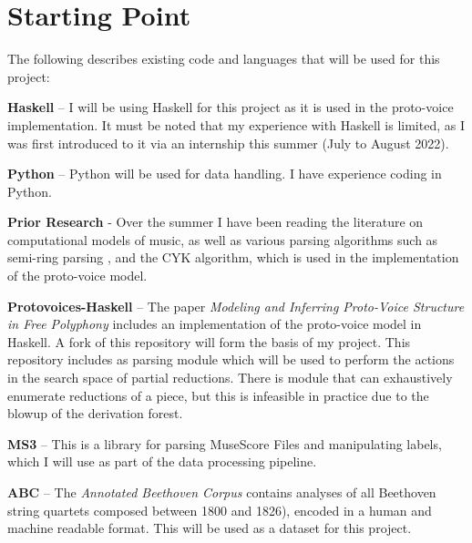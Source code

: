 \documentclass{article}
\newcommand{\keyword}[1]{\textbf{#1}}
\begin{document}
\section{Starting Point}
The following describes existing code and languages that will be used for this project:
\par
\bigskip
\keyword{Haskell} -- I will be using Haskell for this project as it is used in the proto-voice implementation. It must be noted that my experience with Haskell is limited, as I was first introduced to it via an internship this summer (July to August 2022).
\par
\bigskip
\keyword{Python} -- Python will be used for data handling. I have experience coding in Python.
\par
\bigskip
\keyword{Prior Research} - Over the summer I have been reading the literature on computational models of music, as well as various parsing algorithms such as semi-ring parsing \cite{goodmanSemiringParsing1999}, and the CYK algorithm, which is used in the implementation of the proto-voice model.
\par
\bigskip
\keyword{Protovoices-Haskell} -- The paper \textit{Modeling and Inferring Proto-Voice Structure in Free Polyphony}\cite{finkensiepModelingInferringProtovoice2021} includes an implementation of the proto-voice model in Haskell. A fork of this repository will form the basis of my project.
This repository includes as parsing module which will be used to perform the actions in the search space of partial reductions. There is module that can exhaustively enumerate reductions of a piece, but this is infeasible in practice due to the blowup of the derivation forest.
\par
\bigskip
\keyword{MS3} -- This is a library for parsing MuseScore Files and manipulating labels\cite{johannesMs3ParsingMuseScore2021}, which I will use as part of the data processing pipeline.
\par
\bigskip
\keyword{ABC} -- The \textit{Annotated Beethoven Corpus}\cite{neuwirthAnnotatedBeethovenCorpus2018} contains analyses of all Beethoven string quartets composed between 1800 and 1826), encoded in a human and machine readable format. This will be used as a dataset for this project. 
\par
%
\end{document}

